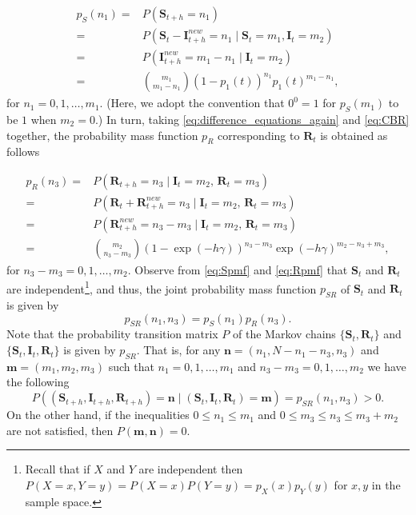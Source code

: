 \documentclass[a4paper,preprint]{elsarticle}
\renewcommand{\vec}[1]{\boldsymbol{#1}}
\begin{document}
\begin{equation}
\begin{split}
\label{eq:Spmf}
p_S(n_1)=&P(\vec{S}_{t+h}=n_1)\\
={} & P(\vec{S}_{t}-\vec{I}_{t+h}^{new}=n_1\mid \vec{S}_{t}=m_1,\vec{I}_{t}=m_2) \\
={} & P(\vec{I}_{t+h}^{new}=m_1-n_1\mid \vec{I}_{t}=m_2) \\
={} & {\binom{m_1}{m_1-n_1}}(1-p_1(t))^{n_1}p_1(t)^{m_1-n_1},       
\end{split}
\end{equation}
%
for $n_1=0,1,\ldots,m_1$. (Here, we adopt the convention that $0^0 = 1$ for $p_S(m_1)$ to be $1$ when $m_2 = 0$.) In turn, taking \eqref{eq:difference_equations_again} and \eqref{eq:CBR} together, the probability mass function  $p_R$ corresponding to $\vec{R}_{t}$ is obtained as follows 

\begin{equation}
\begin{split}
\label{eq:Rpmf} 
p_R(n_3)=&P(\vec{R}_{t+h}=n_3 \mid \vec{I}_{t}=m_2 \mbox{, } \vec{R}_{t}=m_3)\\    
=&P(\vec{R}_{t} + \vec{R}_{t+h}^{new}=n_3 \mid \vec{I}_{t}=m_2 \mbox{, } \vec{R}_{t}=m_3) \\
=&P(\vec{R}_{t+h}^{new}=n_3-m_3 \mid \vec{I}_{t}=m_2 \mbox{, } \vec{R}_{t}=m_3) \\
=& {\binom{m_2}{n_3-m_3}}(1-\exp(-h\gamma))^{n_3-m_3}\exp(-h\gamma)^{m_2-n_3+m_3},      
\end{split}
\end{equation}
for $n_3-m_3=0,1,\ldots,m_2$. Observe from \eqref{eq:Spmf} and \eqref{eq:Rpmf} that $\vec{S}_{t}$ and $\vec{R}_{t}$ are independent\footnote{Recall that if $X$ and $Y$ are independent then $P(X= x,Y= y)=P(X= x)P(Y= y)=p_{X}(x)p_{Y}(y)$ for $x,y$ in the sample space.}, and thus, the joint probability mass function $p_{SR}$ of $\vec{S}_{t}$ and $\vec{R}_{t}$ is given by
%
\begin{equation}
\label{eq:jpmf} 
p_{SR}(n_1,n_3)=p_S(n_1)p_R(n_3).    
\end{equation}
%
Note that the probability transition matrix $P$ of the Markov chains $\{\vec{S}_{t},\vec{R}_{t}\}$ and $\{\vec{S}_{t},\vec{I}_{t}, \vec{R}_{t}\}$ is given by $p_{SR}$. That is,  
for any $\vec{n}=(n_1,N-n_1-n_3,n_3)$ and $\vec{m}=(m_1,m_2,m_3)$ such that $n_1=0,1,\ldots,m_1$ and $n_3-m_3=0,1,\ldots,m_2$ we have the following
\begin{equation}
\label{eqn:finalform}
P((\vec{S}_{t+h}, \vec{I}_{t+h}, \vec{R}_{t+h})=\vec{n}\mid (\vec{S}_{t}, \vec{I}_{t}, \vec{R}_{t})=\vec{m})
=p_{SR}(n_1,n_3)>0.
\end{equation}
%
On the other hand, if the inequalities  $0\leq n_1\leq m_1$ and $0\leq m_3 \leq n_3 \leq m_3+m_2$ are not satisfied, then $P(\vec{m},\vec{n})=0$. 
\end{document}
